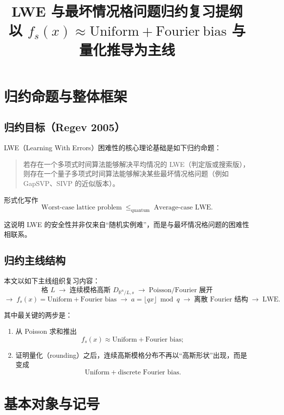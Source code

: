 \documentclass[12pt,a4paper]{ctexart}
\title{LWE 与最坏情况格问题归约复习提纲\\
\large 以 \texorpdfstring{$f_s(x)\approx \mathrm{Uniform}+\mathrm{Fourier\ bias}$}{fs(x) approx Uniform + Fourier bias} 与量化推导为主线}
\author{}
\date{}
\newcommand{\R}{\mathbb{R}}
\begin{document}
\maketitle
\tableofcontents
\newpage

\section{归约命题与整体框架}

\subsection{归约目标（Regev 2005）}

LWE（Learning With Errors）困难性的核心理论基础是如下归约命题：

\begin{quote}
若存在一个多项式时间算法能够解决平均情况的 LWE（判定版或搜索版），则存在一个量子多项式时间算法能够解决某些最坏情况格问题（例如 GapSVP、SIVP 的近似版本）。
\end{quote}

形式化写作
\[
\text{Worst-case lattice problem}
\;\leq_{\text{quantum}}\;
\text{Average-case LWE}.
\]

这说明 LWE 的安全性并非仅来自“随机实例难”，而是与最坏情况格问题的困难性相联系。

\subsection{归约主线结构}

本文以如下主线组织复习内容：
\[
\text{格 }L
\;\longrightarrow\;
\text{连续模格高斯 }D_{\R^n/L,s}
\;\longrightarrow\;
\text{Poisson/Fourier 展开}
\]
\[
\longrightarrow\;
f_s(x)=\text{Uniform}+\text{Fourier bias}
\;\longrightarrow\;
a=\lfloor qx\rfloor \bmod q
\;\longrightarrow\;
\text{离散 Fourier 结构}
\;\longrightarrow\;
\text{LWE}.
\]

其中最关键的两步是：

\begin{enumerate}[label=\arabic*.]
    \item 从 Poisson 求和推出
    \[
    f_s(x)\approx \text{Uniform}+\text{Fourier bias};
    \]
    \item 证明量化（rounding）之后，连续高斯模格分布不再以“高斯形状”出现，而是变成
    \[
    \text{Uniform}+\text{discrete Fourier bias}.
    \]
\end{enumerate}

\section{基本对象与记号}
\end{document}
